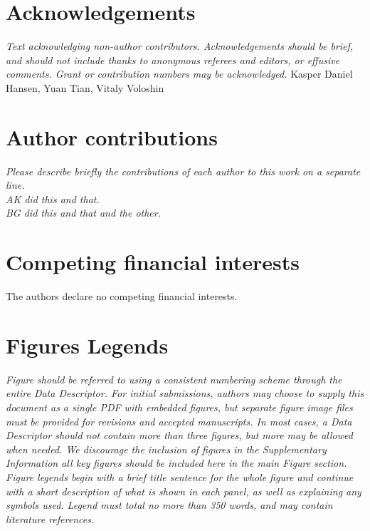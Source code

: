 \documentclass[english]{article}
\begin{document}
\section*{Acknowledgements}

\textit{Text acknowledging non-author contributors. Acknowledgements should
be brief, and should not include thanks to anonymous referees and
editors, or effusive comments. Grant or contribution numbers may be
acknowledged.}  Kasper Daniel Hansen, Yuan Tian, Vitaly Voloshin

\section*{Author contributions}
\textit{Please describe briefly the contributions
of each author to this work on a separate line. 
\\
AK did this and that. 
\\
BG did this and that and the other.}


\section*{Competing financial interests}

The authors declare no competing financial interests.


\section*{Figures Legends}

\textit{Figure should be referred to using a consistent numbering scheme through
the entire Data Descriptor. For initial submissions, authors may choose
to supply this document as a single PDF with embedded figures, but
separate figure image files must be provided for revisions and accepted
manuscripts. In most cases, a Data Descriptor should not contain more
than three figures, but more may be allowed when needed. We discourage
the inclusion of figures in the Supplementary Information \textendash{}
all key figures should be included here in the main Figure section. 
\\
Figure legends begin with a brief title sentence for the whole figure
and continue with a short description of what is shown in each panel,
as well as explaining any symbols used. Legend must total no more
than 350 words, and may contain literature references.}
\end{document}
